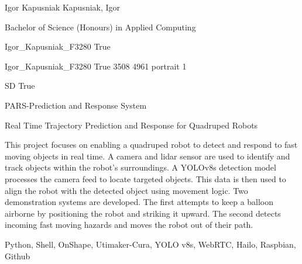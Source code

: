 
\begingroup{}\relax



\def\Key{Igor_Kapusniak_F3280}

{Igor Kapusniak}
{Kapusniak, Igor}

{Bachelor of Science (Honours) in Applied Computing}

{Igor_Kapusniak_F3280}
{True}

{Igor_Kapusniak_F3280}
{True}
{3508}
{4961}
{portrait}
{1}

{SD}
{True}

{PARS-Prediction and Response System}

{Real Time Trajectory Prediction and Response for Quadruped Robots}

{This project focuses on enabling a quadruped robot to detect and respond to fast moving objects in real time. A camera and lidar sensor are used to identify and track objects within the robot's surroundings. A YOLOv8s detection model processes the camera feed to locate targeted objects. This data is then used to align the robot with the detected object using movement logic. Two demonstration systems are developed. The first attempts to keep a balloon airborne by positioning the robot and striking it upward. The second detects incoming fast moving hazards and moves the robot out of their path.}

{Python, Shell, OnShape, Utimaker-Cura, YOLO v8s, WebRTC, Hailo, Raspbian, Github}

